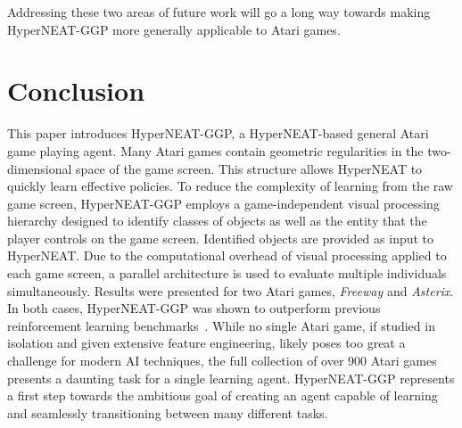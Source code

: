\documentclass{acm_proc_article-sp}
\begin{document}

Addressing these two areas of future work will go a long way towards making HyperNEAT-GGP more generally applicable to Atari games.

\section{Conclusion}
\label{sec:conclusion}
This paper introduces HyperNEAT-GGP, a HyperNEAT-based general Atari game playing agent. Many Atari games contain geometric regularities in the two-dimensional space of the game screen. This structure allows HyperNEAT to quickly learn effective policies. To reduce the complexity of learning from the raw game screen, HyperNEAT-GGP employs a game-independent visual processing hierarchy designed to identify classes of objects as well as the entity that the player controls on the game screen. Identified objects are provided as input to HyperNEAT. Due to the computational overhead of visual processing applied to each game screen, a parallel architecture is used to evaluate multiple individuals simultaneously. Results were presented for two Atari games, \textit{Freeway} and \textit{Asterix}. In both cases, HyperNEAT-GGP was shown to outperform previous reinforcement learning benchmarks~\cite{naddaf10}. While no single Atari game, if studied in isolation and given extensive feature engineering, likely poses too great a challenge for modern AI techniques, the full collection of over 900 Atari games presents a daunting task for a single learning agent. HyperNEAT-GGP represents a first step towards the ambitious goal of creating an agent capable of learning and seamlessly transitioning between many different tasks.



\end{document}

